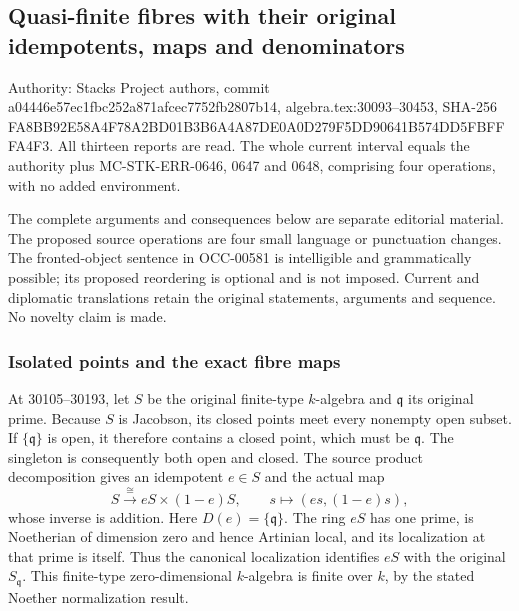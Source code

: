 \subsection{Quasi-finite fibres with their original idempotents, maps and denominators}\label{algebra-proof-031-quasi-finite-fibres-with-their-original-idempotents-maps-and-denominators}

Authority: Stacks Project authors, commit a044\allowbreak{}46e5\allowbreak{}7ec1\allowbreak{}fbc2\allowbreak{}52a8\allowbreak{}71af\allowbreak{}cec7\allowbreak{}752f\allowbreak{}b280\allowbreak{}7b14, algebra.\AlgebraIdentifierBreak{}tex:\AlgebraIdentifierBreak{}30093--\AlgebraIdentifierBreak{}30453, SHA-256 FA8B\allowbreak{}B92E\allowbreak{}58A4\allowbreak{}F78A\allowbreak{}2BD0\allowbreak{}1B3B\allowbreak{}6A4A\allowbreak{}87DE\allowbreak{}0A0D\allowbreak{}279F\allowbreak{}5DD9\allowbreak{}0641\allowbreak{}B574\allowbreak{}DD5F\allowbreak{}BFFF\allowbreak{}A4F3. All thirteen reports are read. The whole current interval equals the authority plus MC-\AlgebraIdentifierBreak{}STK-\AlgebraIdentifierBreak{}ERR-\AlgebraIdentifierBreak{}0646, 0647 and 0648, comprising four operations, with no added environment.

The complete arguments and consequences below are separate editorial material. The proposed source operations are four small language or punctuation changes. The fronted-object sentence in OCC-00581 is intelligible and grammatically possible; its proposed reordering is optional and is not imposed. Current and diplomatic translations retain the original statements, arguments and sequence. No novelty claim is made.

\subsubsection{Isolated points and the exact fibre maps}\label{algebra-proof-031-isolated-points-and-the-exact-fibre-maps}

At 30105--30193, let \(S\) be the original finite-type \(k\)-algebra and \(\mathfrak q\) its original prime. Because \(S\) is Jacobson, its closed points meet every nonempty open subset. If \(\{\mathfrak q\}\) is open, it therefore contains a closed point, which must be \(\mathfrak q\). The singleton is consequently both open and closed. The source product decomposition gives an idempotent \(e\in S\) and the actual map \[
 S\xrightarrow{\cong}eS\times(1-e)S,\qquad s\longmapsto(es,(1-e)s),
\] whose inverse is addition. Here \(D(e)=\{\mathfrak q\}\). The ring \(eS\) has one prime, is Noetherian of dimension zero and hence Artinian local, and its localization at that prime is itself. Thus the canonical localization identifies \(eS\) with the original \(S_{\mathfrak q}\). This finite-type zero-dimensional \(k\)-algebra is finite over \(k\), by the stated Noether normalization result.


